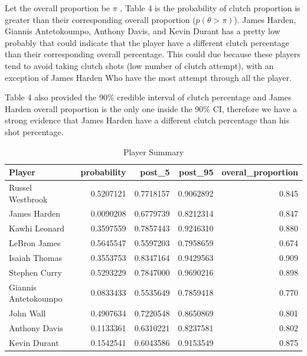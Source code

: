 \documentclass[
]{article}
\begin{document}
Let the overall proportion be \(\pi\) , Table 4 is the probability of
clutch proportion is greater than their corresponding overall proportion
(\(p(\theta > \pi)\)). James Harden, Giannis Antetokoumpo, Anthony
Davis, and Kevin Durant has a pretty low probably that could indicate
that the player have a different clutch percentage than their
corresponding overall percentage. This could due because these players
tend to avoid taking clutch shots (low number of clutch attempt), with
an exception of James Harden Who have the most attempt through all the
player.

Table 4 also provided the 90\% credible interval of clutch percentage
and James Harden overall proportion is the only one inside the 90\% CI,
therefore we have a strong evidence that James Harden have a different
clutch percentage than his shot percentage.

\begin{table}[H]

\caption{\label{tab:unnamed-chunk-7}Player Summary}
\centering
\begin{tabular}[t]{lrrrr}
\toprule
Player & probability & post\_5 & post\_95 & overal\_proportion\\
\midrule
Russel Westbrook & 0.5207121 & 0.7718157 & 0.9062892 & 0.845\\
James Harden & 0.0090208 & 0.6779739 & 0.8212314 & 0.847\\
Kawhi Leonard & 0.3597559 & 0.7857443 & 0.9246310 & 0.880\\
LeBron James & 0.5645547 & 0.5597203 & 0.7958659 & 0.674\\
Isaiah Thomas & 0.3553753 & 0.8347164 & 0.9429563 & 0.909\\
\addlinespace
Stephen Curry & 0.5293229 & 0.7847000 & 0.9690216 & 0.898\\
Giannis Antetokoumpo & 0.0833433 & 0.5535649 & 0.7859418 & 0.770\\
John Wall & 0.4907634 & 0.7220548 & 0.8650869 & 0.801\\
Anthony Davis & 0.1133361 & 0.6310221 & 0.8237581 & 0.802\\
Kevin Durant & 0.1542541 & 0.6043586 & 0.9153549 & 0.875\\
\bottomrule
\end{tabular}
\end{table}
\end{document}

